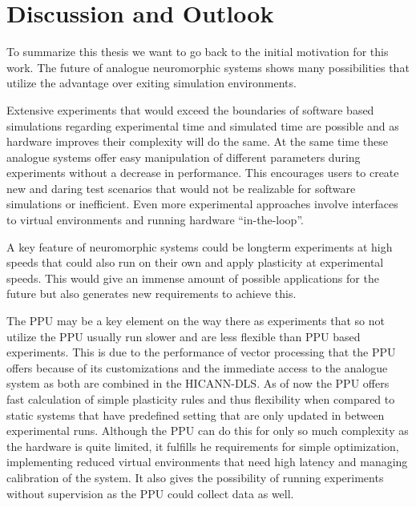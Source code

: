 \chapter{Discussion and Outlook}
\label{chapter:discussion}

To summarize this thesis we want to go back to the initial motivation for this work.
The future of analogue neuromorphic systems shows many possibilities that utilize the advantage over exiting simulation environments.

Extensive experiments that would exceed the boundaries of software based simulations regarding experimental time and simulated time are possible and as hardware improves their complexity will do the same.
At the same time these analogue systems offer easy manipulation of different parameters during experiments without a decrease in performance.
This encourages users to create new and daring test scenarios that would not be realizable for software simulations or inefficient.
Even more experimental approaches involve interfaces to virtual environments and running hardware ``in-the-loop''.

A key feature of neuromorphic systems could be longterm experiments at high speeds that could also run on their own and apply plasticity at experimental speeds.
This would give an immense amount of possible applications for the future but also generates new requirements to achieve this.

The PPU may be a key element on the way there as experiments that so not utilize the PPU usually run slower and are less flexible than PPU based experiments.
This is due to the performance of vector processing that the PPU offers because of its customizations and the immediate access to the analogue system as both are combined in the HICANN-DLS.
As of now the PPU offers fast calculation of simple plasticity rules and thus flexibility when compared to static systems that have predefined setting that are only updated in between experimental runs.
Although the PPU can do this for only so much complexity as the hardware is quite limited, it fulfills he requirements for simple optimization, implementing reduced virtual environments that need high latency and managing calibration of the system.
It also gives the possibility of running experiments without supervision as the PPU could collect data as well.

